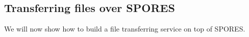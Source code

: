 \subsection{Transferring files over \acs{SPORES}}%
\label{sec:file_exchange}

We will now show how to build a file transferring service on top of 
\ac{SPORES}.
